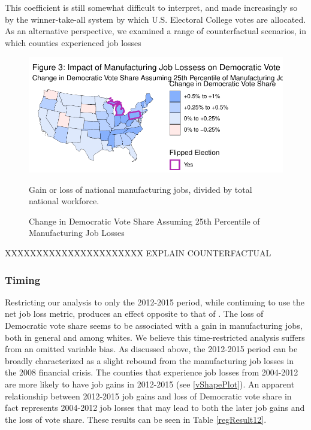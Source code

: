 \documentclass[]{AEA}
\begin{document}
This coefficient is still somewhat difficult to interpret, and made
increasingly so by the winner-take-all system by which U.S. Electoral
College votes are allocated. As an alternative perspective, we examined
a range of counterfactual scenarios, in which counties experienced job
losses

\begin{figure} \label{natlPlot}
\caption{Change in Democratic Vote Share Assuming 25th Percentile of Manufacturing Job Losses}

\begin{center}\includegraphics{Final-Draft_files/figure-latex/unnamed-chunk-6-1} \end{center}
\begin{figurenotes}
Gain or loss of national manufacturing jobs, divided by total national workforce.
\end{figurenotes}
\end{figure}

XXXXXXXXXXXXXXXXXXXXXX EXPLAIN COUNTERFACTUAL

\subsubsection{Timing}

Restricting our analysis to only the 2012-2015 period, while continuing
to use the net job loss metric, produces an effect opposite to that of
\cite{Baccini21}. The loss of Democratic vote share seems to be
associated with a gain in manufacturing jobs, both in general and among
whites. We believe this time-restricted analysis suffers from an omitted
variable bias. As discussed above, the 2012-2015 period can be broadly
characterized as a slight rebound from the manufacturing job losses in
the 2008 financial crisis. The counties that experience job losses from
2004-2012 are more likely to have job gains in 2012-2015 (see
\ref{vShapePlot}). An apparent relationship between 2012-2015 job gains
and loss of Democratic vote share in fact represents 2004-2012 job
losses that may lead to both the later job gains and the loss of vote
share. These results can be seen in Table \ref{regResult12}.
\end{document}
